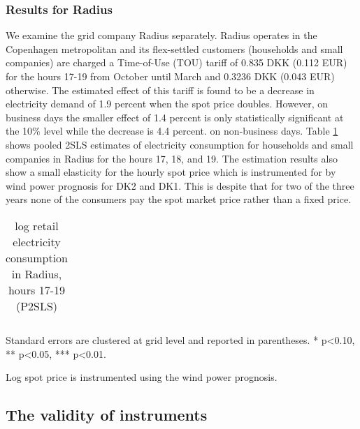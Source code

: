 \subsubsection{Results for Radius}
We examine the grid company Radius separately. Radius operates in the Copenhagen metropolitan and its flex-settled customers (households and small companies) are charged a Time-of-Use (TOU) tariff of 0.835 DKK (0.112 EUR) for the hours 17-19 from October until March and 0.3236 DKK (0.043 EUR) otherwise. The estimated effect of this tariff is found to be a decrease in electricity demand of 1.9 percent when the spot price doubles. However, on business days the smaller effect of 1.4 percent is only statistically significant at the 10\% level while the decrease is 4.4 percent. on non-business days. Table \ref{tab:r_radius} shows pooled 2SLS estimates of electricity consumption for households and small companies in Radius for the hours 17, 18, and 19. The estimation results also show a small elasticity for the hourly spot price which is instrumented for by wind power prognosis for DK2 and DK1. This is despite that for two of the three years none of the consumers pay the spot market price rather than a fixed price. 
\begin{table}[H]
\begin{threeparttable}
  \vspace{-0.0cm}
  \centering
  \caption{log retail electricity consumption in Radius, hours 17-19 (P2SLS)}
  \label{tab:r_radius}
      \footnotesize
  \begin{tabular}{lccc}
        
  \end{tabular}
    \begin{tablenotes}
        \item  Standard errors are clustered at grid level and reported in parentheses. * p<0.10, ** p<0.05, *** p<0.01.
         \item Log spot price is instrumented using the wind power prognosis.
    \end{tablenotes}
  \vspace{-0.0cm}
  \end{threeparttable}
\end{table}


\subsection{The validity of instruments}
\label{subsec:r_validity}

